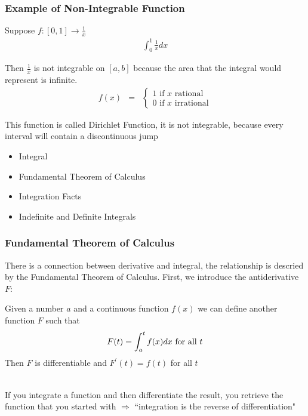 \documentclass{beamer}
\numberwithin{equation}{section}
\begin{document}
\begin{frame}
\frametitle{Example of Non-Integrable Function}

Suppose $f:[0,1]\rightarrow \frac{1}{x}$ 
\begin{eqnarray}
\int_{0}^{1} \frac{1}{x} dx \nonumber 
\end{eqnarray} \pause 

Then $\frac{1}{x}$ is not integrable on $[a,b]$ because the area that the integral would represent is infinite.  \pause \\ 

\begin{eqnarray}
f(x) & = & \begin{cases}
1 \text{ if $x$ rational} \nonumber \\
0 \text{ if $x$ irrational} \end{cases} 
\end{eqnarray} \pause 

This function is called Dirichlet Function, it is not integrable, because every interval will contain a discontinuous jump 

\end{frame}



\begin{frame}

\begin{itemize}
\item \textcolor{mygray}{Integral}
\item \textcolor{myblack}{Fundamental Theorem of Calculus}
\item \textcolor{mygray}{Integration Facts}
\item \textcolor{mygray}{Indefinite and Definite Integrals}
\end{itemize}

\end{frame}



\begin{frame}
\frametitle{Fundamental Theorem of Calculus}

There is a connection between derivative and integral, the relationship is descried by the Fundamental Theorem of Calculus. \pause First, we introduce the antiderivative $F$:

\begin{theorem}
Given a number $a$ and a continuous function $f(x)$ we can define another function $F$ such that $$F(t)=\int_a^t f(x) dx \hbox{ for all } t$$
Then $F$ is differentiable and $F^\prime(t)=f(t)$ for all $t$
\end{theorem} \pause
 
\ \\If you integrate a function and then differentiate the result, you retrieve the function that you started with  $\Rightarrow$ ``integration is the reverse of differentiation"

\end{frame}
\end{document}
